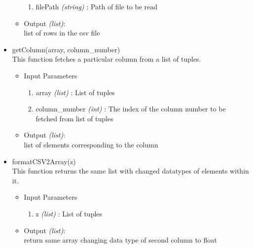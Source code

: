 \begin{itemize}
\begin{itemize}
	  \begin{enumerate}
	    \item filePath \textit{(string)} : Path of file to be read
	    \end{enumerate}

	  \item Output \textit{(list)}: \\
	  list of rows in the csv file
	  
	\end{itemize}
 
 \item getColumn(array, column\_number) \\
 
   This function fetches a particular column from a list of tuples.
 
 \begin{itemize}
	  \item Input Parameters
	  
	  \begin{enumerate}
	    \item array \textit{(list)} : List of tuples
	    \item column\_number \textit{(int)} : The index of the column number to be fetched from list of tuples
	    \end{enumerate}

	  \item Output \textit{(list)}: \\
	  list of elements corresponding to the column
	  
	\end{itemize}
	
 \item formatCSV2Array(z) \\
 
    This function returns the same list with changed datatypes of elements within it.
 
 \begin{itemize}
	  \item Input Parameters
	  
	  \begin{enumerate}
	    \item z \textit{(list)} : List of tuples
	    \end{enumerate}

	  \item Output \textit{(list)}: \\
	  return same array changing data type of second column to float
	  
	\end{itemize}
 

\end{itemize}


